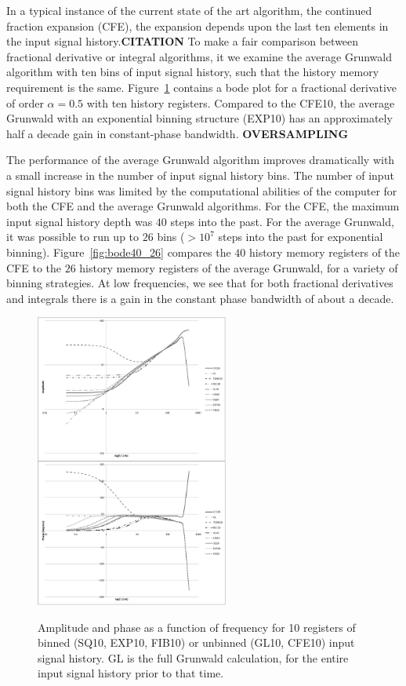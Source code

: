 In a typical instance of the current state of the art algorithm, the
continued fraction expansion (CFE), the expansion depends upon the
last ten elements in the input signal history.{\bf CITATION} To make a
fair comparison between fractional derivative or integral algorithms,
it we examine the average Grunwald algorithm with ten bins of input
signal history, such that the history memory requirement is the
same. Figure~\ref{fig:bode10p05} contains a bode plot for a fractional
derivative of order $\alpha=0.5$ with ten history registers. Compared
to the CFE10, the average Grunwald with an exponential binning
structure (EXP10) has an approximately half a decade gain in
constant-phase bandwidth. {\bf OVERSAMPLING}

The performance of the average Grunwald algorithm improves
dramatically with a small increase in the number of input signal
history bins. The number of input signal history bins was limited by
the computational abilities of the computer for both the CFE and the
average Grunwald algorithms. For the CFE, the maximum input signal
history depth was $40$ steps into the past. For the average Grunwald,
it was possible to run up to $26$ bins ($>10^7$ steps into the past
for exponential binning). Figure~\ref{fig:bode40_26} compares the $40$
history memory registers of the CFE to the $26$ history memory
registers of the average Grunwald, for a variety of binning
strategies. At low frequencies, we see that for both fractional
derivatives and integrals there is a gain in the constant phase
bandwidth of about a decade.

\begin{figure}
\includegraphics[width=2.5in]{bode10000_10_10_p05.eps}
\label{fig:bode10p05}
\caption{Amplitude and phase as a function of frequency for 10
  registers of binned (SQ10, EXP10, FIB10) or unbinned (GL10, CFE10)
  input signal history. GL is the full Grunwald calculation, for the
  entire input signal history prior to that time.}
\end{figure}

